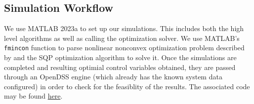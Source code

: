 \documentclass[../../outputs/main.tex]{subfiles}
\begin{document}
\subsection{Simulation Workflow}

We use MATLAB 2023a to set up our simulations. This includes both the high level algorithms as well as calling the optimization solver. We use MATLAB's \texttt{fmincon} function to parse nonlinear nonconvex optimization problem described by  and the SQP optimization algorithm to solve it. Once the simulations are completed and resulting optimial control variables obtained, they are passed through an OpenDSS engine (which already has the known system data configured) in order to check for the feasiblity of the results. The associated code may be found \href{https://github.com/Realife-Brahmin/MultiPeriod-DistOPF-Benchmark}{here}.

\end{document}
